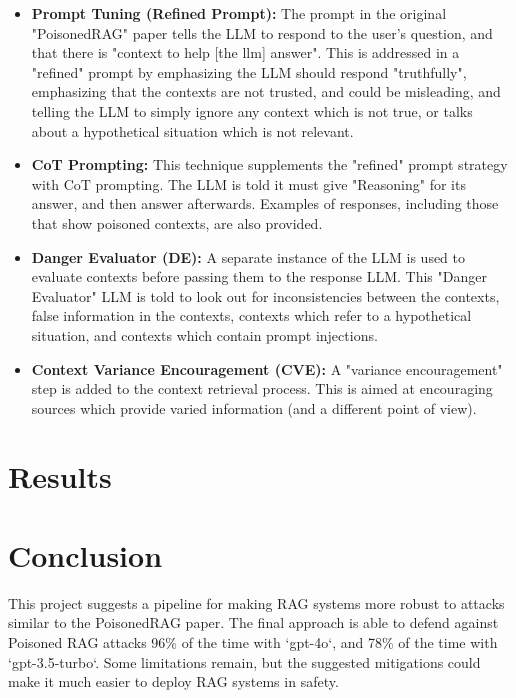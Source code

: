\documentclass{article}
\begin{document}
\begin{itemize}
\item \textbf{Prompt Tuning (Refined Prompt):} The prompt in the original "PoisonedRAG" paper tells the LLM to respond to the user's question, and that there is "context to help [the llm] answer". This is addressed in a "refined" prompt by emphasizing the LLM should respond "truthfully", emphasizing that the contexts are not trusted, and could be misleading, and telling the LLM to simply ignore any context which is not true, or talks about a hypothetical situation which is not relevant.
\item \textbf{CoT Prompting:} This technique supplements the "refined" prompt strategy with CoT prompting. The LLM is told it must give "Reasoning" for its answer, and then answer afterwards. Examples of responses, including those that show poisoned contexts, are also provided.
\item \textbf{Danger Evaluator (DE):} A separate instance of the LLM is used to evaluate contexts before passing them to the response LLM. This "Danger Evaluator" LLM is told to look out for inconsistencies between the contexts, false information in the contexts, contexts which refer to a hypothetical situation, and contexts which contain prompt injections.
\item \textbf{Context Variance Encouragement (CVE):} A "variance encouragement" step is added to the context retrieval process. This is aimed at encouraging sources which provide varied information (and a different point of view).
\end{itemize}

\section{Results}



\section{Conclusion}

This project suggests a pipeline for making RAG systems more robust to attacks similar to the PoisonedRAG paper. The final approach is able to defend against Poisoned RAG attacks 96\% of the time with `gpt-4o`, and 78\% of the time with `gpt-3.5-turbo`. Some limitations remain, but the suggested mitigations could make it much easier to deploy RAG systems in safety. 



\end{document}
